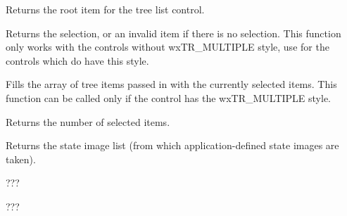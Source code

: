 \label{wxtreelistctrlgetrootitem}


Returns the root item for the tree list control.

\label{wxtreelistctrlgetselection}


Returns the selection, or an invalid item if there is no selection.
This function only works with the controls without wxTR\_MULTIPLE style, use
 for the controls which do have
this style.

\label{wxtreelistctrlgetselections}


Fills the array of tree items passed in with the currently selected items. This
function can be called only if the control has the wxTR\_MULTIPLE style.

Returns the number of selected items.



\label{wxtreelistctrlgetstateimagelist}


Returns the state image list (from which application-defined state images are taken).

\label{wxtreelistctrlgetwindowstyle}


???

\label{wxtreelistctrlgetwindowstyleflag}


???

\label{wxtreelistctrlhittest}


